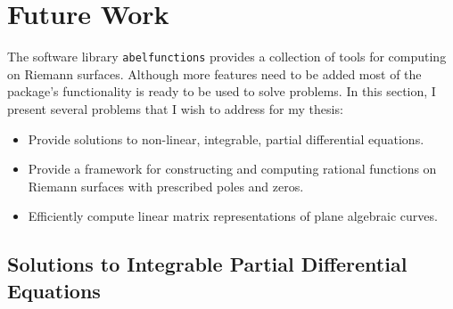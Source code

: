 \section{Future Work}

The software library {\tt abelfunctions} provides a collection of tools
for computing on Riemann surfaces. Although more features need to be
added most of the package's functionality is ready to be used to solve
problems. In this section, I present several problems that I wish to
address for my thesis:
\begin{itemize}
  \item Provide solutions to non-linear, integrable, partial
    differential equations.
  \item Provide a framework for constructing and computing rational
    functions on Riemann surfaces with prescribed poles and zeros.
  \item Efficiently compute linear matrix representations of plane
    algebraic curves.
\end{itemize}



\subsection{Solutions to Integrable Partial Differential Equations}



